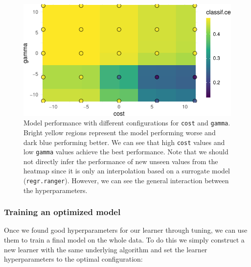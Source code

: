 \begin{figure}[H]

{\centering \includegraphics[width=1\textwidth,height=\textheight]{chapters/chapter4/hyperparameter_optimization_files/figure-pdf/fig-surface-1.pdf}

}

\caption{\label{fig-surface}Model performance with different
configurations for \texttt{cost} and \texttt{gamma}. Bright yellow
regions represent the model performing worse and dark blue performing
better. We can see that high \texttt{cost} values and low \texttt{gamma}
values achieve the best performance. Note that we should not directly
infer the performance of new unseen values from the heatmap since it is
only an interpolation based on a surrogate model (\texttt{regr.ranger}).
However, we can see the general interaction between the
hyperparameters.}

\end{figure}

\hypertarget{training-an-optimized-model}{%
\subsubsection*{Training an optimized
model}\label{training-an-optimized-model}}

Once we found good hyperparameters for our learner through tuning, we
can use them to train a final model on the whole data. To do this we
simply construct a new learner with the same underlying algorithm and
set the learner hyperparameters to the optimal configuration:

\begin{Shaded}
\begin{Highlighting}[]
\OtherTok{=} \NormalTok{(}\NormalTok{)}
\SpecialCharTok{$}\SpecialCharTok{$}\OtherTok{=}\SpecialCharTok{$}
\end{Highlighting}
\end{Shaded}

